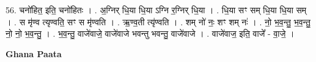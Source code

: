 \documentclass[17pt]{extarticle}
\begin{document}
56. चनो॑हित॒ इति॒ चनो॑हितः । . अ॒ग्निर् धि॒या धि॒या ऽग्नि र॒ग्निर् धि॒या । . धि॒या सꣳ सम् धि॒या धि॒या सम् । . स मृ॑ण्व त्यृण्वति॒ सꣳ स मृ॑ण्वति । . ऋ॒ण्व॒ती त्यृ॑ण्वति । . शम् नो॑ नः॒ शꣳ शम् नः॑ । . नो॒ भ॒व॒न्तु॒ भ॒व॒न्तु॒ नो॒ नो॒ भ॒व॒न्तु॒ । . भ॒व॒न्तु॒ वाजे॑वाजे॒ वाजे॑वाजे भवन्तु भवन्तु॒ वाजे॑वाजे । . वाजे॑वाज॒ इति॒ वाजे᳚ - वा॒जे॒ । \newline

\textbf{Ghana Paata } \newline
\end{document}
